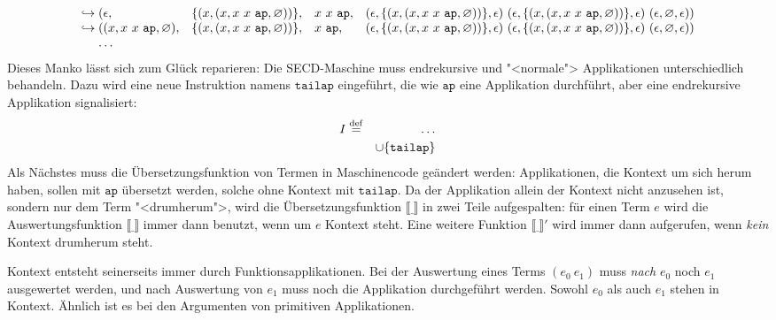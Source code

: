 \begin{displaymath}
\begin{array}{l@{}llll}
\hookrightarrow{}&(\epsilon, &\{(x, (x, x~x~\mathtt{ap}, \varnothing))\}, &x~x~\mathtt{ap}, &(\epsilon, \{(x, (x, x~x~\mathtt{ap}, \varnothing))\}, \epsilon)~(\epsilon, \{(x, (x, x~x~\mathtt{ap}, \varnothing))\}, \epsilon)~(\epsilon, \varnothing, \epsilon))\\
\hookrightarrow{}&((x, x~x~\mathtt{ap}, \varnothing), &\{(x, (x, x~x~\mathtt{ap}, \varnothing))\}, &x~\mathtt{ap}, &(\epsilon, \{(x, (x, x~x~\mathtt{ap}, \varnothing))\}, \epsilon)~(\epsilon, \{(x, (x, x~x~\mathtt{ap}, \varnothing))\}, \epsilon)~(\epsilon, \varnothing, \epsilon))
\\
& \ldots
  \end{array}
\end{displaymath}
%
Dieses Manko lässt sich zum Glück reparieren: Die
SECD-Maschine muss endrekursive und "<normale"> Applikationen
unterschiedlich behandeln.  Dazu wird eine neue Instruktion namens
$\mathtt{tailap}$ eingeführt, die wie $\mathtt{ap}$ eine Applikation
durchführt, aber eine endrekursive Applikation signalisiert:
%
\begin{eqnarray*}
  I &\stackrel{\rm def}{=}& \ldots\\
  &&\cup \{ \mathtt{tailap} \}
\end{eqnarray*}
%
Als Nächstes muss die Übersetzungsfunktion von Termen in Maschinencode
geändert werden:  Applikationen, die Kontext um sich herum haben,
sollen mit $\mathtt{ap}$ übersetzt werden, solche ohne Kontext mit
$\mathtt{tailap}$.  Da der Applikation allein der Kontext nicht
anzusehen ist, sondern nur dem Term "<drumherum">, wird die
Übersetzungsfunktion $\llbracket \underline{~} \rrbracket$ in zwei
Teile aufgespalten: für einen Term $e$ wird die Auswertungsfunktion $\llbracket\underline{~}\rrbracket$ immer dann benutzt, wenn um $e$ Kontext steht.  Eine
weitere Funktion $\llbracket \underline{~} \rrbracket'$ wird immer
dann aufgerufen, wenn \emph{kein} Kontext drumherum steht.

Kontext entsteht seinerseits immer durch Funktionsapplikationen.  Bei
der Auswertung eines Terms $(e_0~e_1)$ muss \emph{nach} $e_0$ noch
$e_1$ ausgewertet werden, und nach Auswertung von $e_1$ muss noch die
Applikation durchgeführt werden.  Sowohl $e_0$ als auch $e_1$ stehen
in Kontext.  Ähnlich ist es bei den Argumenten von primitiven
Applikationen.

